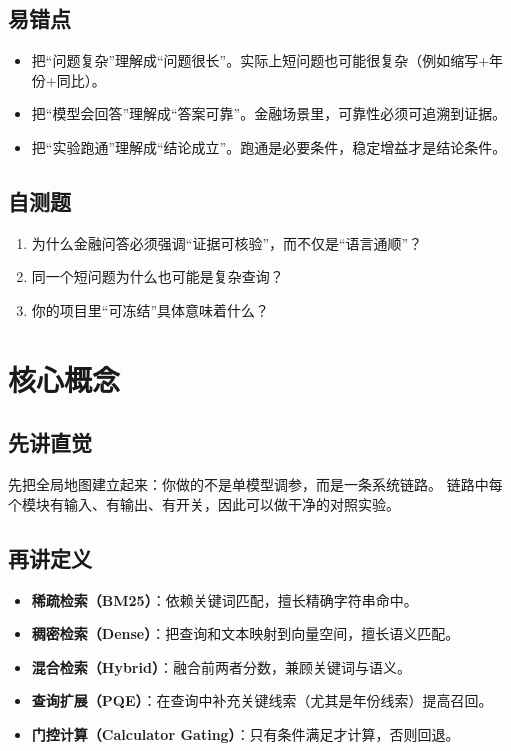 \documentclass[UTF8,a4paper,12pt]{ctexart}
\begin{document}
\subsection{易错点}
\begin{itemize}
  \item 把“问题复杂”理解成“问题很长”。实际上短问题也可能很复杂（例如缩写+年份+同比）。
  \item 把“模型会回答”理解成“答案可靠”。金融场景里，可靠性必须可追溯到证据。
  \item 把“实验跑通”理解成“结论成立”。跑通是必要条件，稳定增益才是结论条件。
\end{itemize}

\subsection{自测题}
\begin{enumerate}
  \item 为什么金融问答必须强调“证据可核验”，而不仅是“语言通顺”？
  \item 同一个短问题为什么也可能是复杂查询？
  \item 你的项目里“可冻结”具体意味着什么？
\end{enumerate}

\section{核心概念}
\subsection{先讲直觉}
先把全局地图建立起来：你做的不是单模型调参，而是一条系统链路。
链路中每个模块有输入、有输出、有开关，因此可以做干净的对照实验。

\subsection{再讲定义}
\begin{itemize}
  \item \textbf{稀疏检索（BM25）}：依赖关键词匹配，擅长精确字符串命中。
  \item \textbf{稠密检索（Dense）}：把查询和文本映射到向量空间，擅长语义匹配。
  \item \textbf{混合检索（Hybrid）}：融合前两者分数，兼顾关键词与语义。
  \item \textbf{查询扩展（PQE）}：在查询中补充关键线索（尤其是年份线索）提高召回。
  \item \textbf{门控计算（Calculator Gating）}：只有条件满足才计算，否则回退。
\end{itemize}
\end{document}
